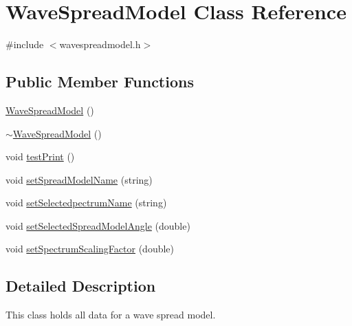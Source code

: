 \hypertarget{class_wave_spread_model}{\section{Wave\-Spread\-Model Class Reference}
\label{class_wave_spread_model}
}


{\ttfamily \#include $<$wavespreadmodel.\-h$>$}

\subsection*{Public Member Functions}
\begin{DoxyCompactItemize}
\item 
\hyperlink{class_wave_spread_model_a08065e2ac96546f949a4fb86c62afbe7}{Wave\-Spread\-Model} ()
\item 
\hyperlink{class_wave_spread_model_a0065ba1f4424c7a6b47dcf4c67efd745}{$\sim$\-Wave\-Spread\-Model} ()
\item 
void \hyperlink{class_wave_spread_model_a2d1ac12e38eb6b2a85511e7e375574cd}{test\-Print} ()
\item 
void \hyperlink{class_wave_spread_model_a993c1cc450ada283870144bcefa0365d}{set\-Spread\-Model\-Name} (string)
\item 
void \hyperlink{class_wave_spread_model_a8679e1123a1aac16512350b4b60bc8e0}{set\-Selectedpectrum\-Name} (string)
\item 
void \hyperlink{class_wave_spread_model_a2ffcea00e587355a238fff0be31a0672}{set\-Selected\-Spread\-Model\-Angle} (double)
\item 
void \hyperlink{class_wave_spread_model_a6efe2a3799d83b172d5f090437cb278a}{set\-Spectrum\-Scaling\-Factor} (double)
\end{DoxyCompactItemize}


\subsection{Detailed Description}
This class holds all data for a wave spread model. 

